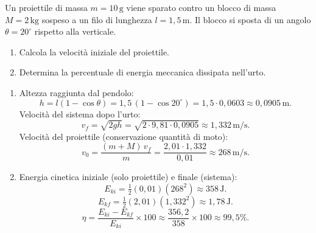 \begin{question}[ID=5.3, subtitle={Velocità del proiettile e perdita energetica dal pendolo}, tags={pendolo balistico, perdita energetica}, difficulty=difficile]
Un proiettile di massa \(m = 10 \, \text{g}\) viene sparato contro un blocco di massa \(M = 2 \, \text{kg}\) sospeso a un filo di lunghezza \(l = 1{,}5 \, \text{m}\). Il blocco si sposta di un angolo \(\theta = 20^\circ\) rispetto alla verticale.
\begin{enumerate}
    \item Calcola la velocità iniziale del proiettile.
    \item Determina la percentuale di energia meccanica dissipata nell'urto.
\end{enumerate}
\begin{solution}
    \begin{enumerate}
        \item Altezza raggiunta dal pendolo:
        \[
            h = l(1-\cos\theta) = 1{,}5\,(1-\cos20^\circ) = 1{,}5 \cdot 0{,}0603 \approx 0{,}0905 \, \text{m}.
        \]
        Velocità del sistema dopo l'urto:
        \[
            v_f = \sqrt{2gh} = \sqrt{2 \cdot 9{,}81 \cdot 0{,}0905} \approx 1{,}332 \, \text{m/s}.
        \]
        Velocità del proiettile (conservazione quantità di moto):
        \[
            v_0 = \frac{(m+M)\,v_f}{m} = \frac{2{,}01 \cdot 1{,}332}{0{,}01} \approx 268 \, \text{m/s}.
        \]
        \item Energia cinetica iniziale (solo proiettile) e finale (sistema):
        \[
            E_{ki} = \tfrac{1}{2}(0{,}01)(268^2) \approx 358 \, \text{J}.
        \]
        \[
            E_{kf} = \tfrac{1}{2}(2{,}01)(1{,}332^2) \approx 1{,}78 \, \text{J}.
        \]
        \[
            \eta = \frac{E_{ki} - E_{kf}}{E_{ki}} \times 100 \approx \frac{356{,}2}{358} \times 100 \approx 99{,}5\%.
        \]
    \end{enumerate}
\end{solution}
\end{question}


